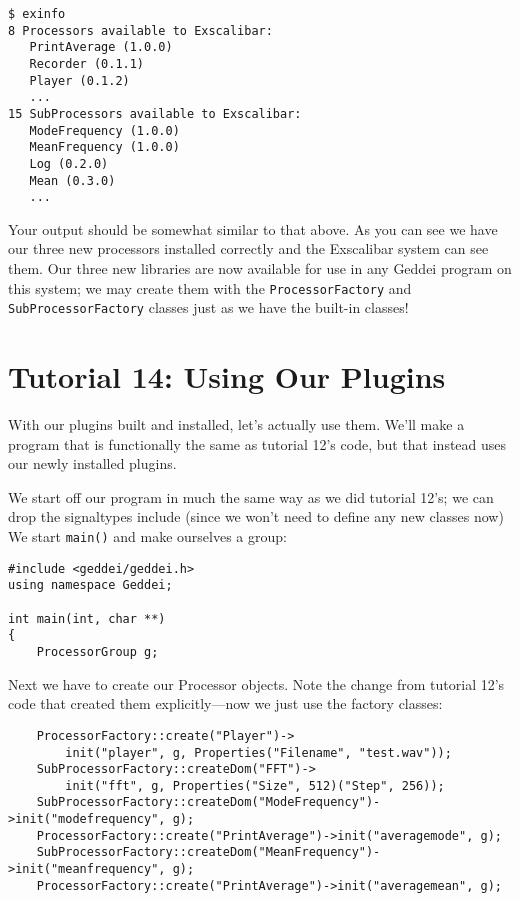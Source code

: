 \begin{verbatim}
$ exinfo
8 Processors available to Exscalibar:
   PrintAverage (1.0.0)
   Recorder (0.1.1)
   Player (0.1.2)
   ...
15 SubProcessors available to Exscalibar:
   ModeFrequency (1.0.0)
   MeanFrequency (1.0.0)
   Log (0.2.0)
   Mean (0.3.0)
   ...
\end{verbatim} 

Your output should be somewhat similar to that above. As you can see we have our three new processors installed correctly and the Exscalibar system can see them. Our three new libraries are now available for use in any Geddei program on this system; we may create them with the \texttt{ProcessorFactory} and \texttt{SubProcessorFactory} classes just as we have the built-in classes!




\section{Tutorial 14: Using Our Plugins}

With our plugins built and installed, let's actually use them. We'll make a program that is functionally the same as tutorial 12's code, but that instead uses our newly installed plugins.

We start off our program in much the same way as we did tutorial 12's; we can drop the signaltypes include (since we won't need to define any new classes now) We start \texttt{main()} and make ourselves a group:

\begin{verbatim}
#include <geddei/geddei.h>
using namespace Geddei;

int main(int, char **)
{
    ProcessorGroup g;
\end{verbatim}

Next we have to create our Processor objects. Note the change from tutorial 12's code that created them explicitly---now we just use the factory classes:

\begin{verbatim}
    ProcessorFactory::create("Player")->
        init("player", g, Properties("Filename", "test.wav"));
    SubProcessorFactory::createDom("FFT")->
        init("fft", g, Properties("Size", 512)("Step", 256));
    SubProcessorFactory::createDom("ModeFrequency")->init("modefrequency", g);
    ProcessorFactory::create("PrintAverage")->init("averagemode", g);
    SubProcessorFactory::createDom("MeanFrequency")->init("meanfrequency", g);
    ProcessorFactory::create("PrintAverage")->init("averagemean", g);
\end{verbatim}

